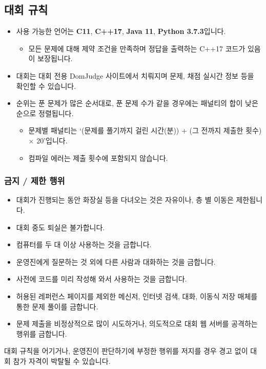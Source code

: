 \subsection*{대회 규칙}
\begin{itemize}
    \item 사용 가능한 언어는 \textbf{C11}, \textbf{C++17}, \textbf{Java 11}, \textbf{Python 3.7.3}입니다.
    \begin{itemize}
        \item 모든 문제에 대해 제약 조건을 만족하며 정답을 출력하는 C++17 코드가 있음이 보장됩니다.
    \end{itemize}
    \item 대회는 대회 전용 DomJudge 사이트에서 치뤄지며 문제, 채점 실시간 정보 등을 확인할 수 있습니다.
    \item 순위는 푼 문제가 많은 순서대로, 푼 문제 수가 같을 경우에는 패널티의 합이 낮은 순으로 정렬됩니다.
    \begin{itemize}
        \item 문제별 패널티는 `(문제를 풀기까지 걸린 시간(분)) + (그 전까지 제출한 횟수) $ \times $ 20'입니다.
        \item 컴파일 에러는 제출 횟수에 포함되지 않습니다.
    \end{itemize}
\end{itemize}
\subsubsection*{금지 / 제한 행위}
\begin{itemize}
    \item 대회가 진행되는 동안 화장실 등을 다녀오는 것은 자유이나, 층 별 이동은 제한됩니다.
    \item 대회 중도 퇴실은 불가합니다.
    \item 컴퓨터를 두 대 이상 사용하는 것을 금합니다.
    \item 운영진에게 질문하는 것 외에 다른 사람과 대화하는 것을 금합니다.
    \item 사전에 코드를 미리 작성해 와서 사용하는 것을 금합니다.
    \item 허용된 레퍼런스 페이지를 제외한 메신저, 인터넷 검색, 대화, 이동식 저장 매체를 통한 문제 풀이를 금합니다.
    \item 문제 제출을 비정상적으로 많이 시도하거나, 의도적으로 대회 웹 서버를 공격하는 행위를 금합니다.
\end{itemize}
대회 규칙을 어기거나, 운영진이 판단하기에 부정한 행위를 저지를 경우 경고 없이 대회 참가 자격이 박탈될 수 있습니다.
